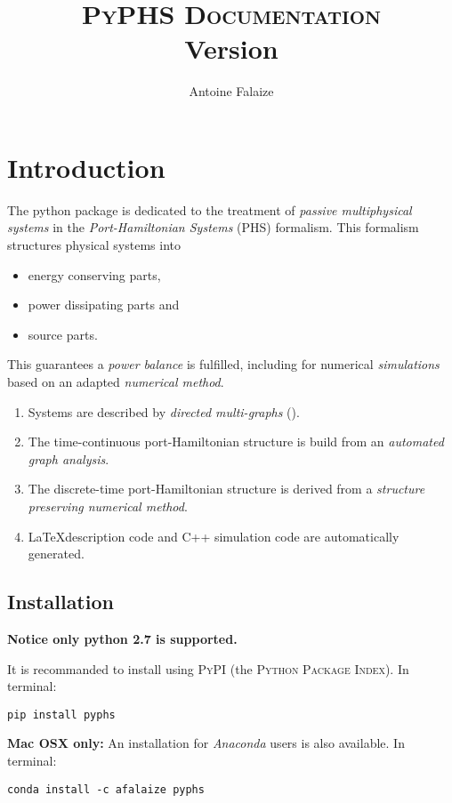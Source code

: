 \documentclass[10pt,a4paper]{article}
\author{Antoine Falaize}
\title{\textsc{PyPHS Documentation}\\ Version \version}
\begin{document}

%
\maketitle
%
\section{Introduction}
%
The python package  is dedicated to the treatment of \emph{passive multiphysical systems} in the \emph{Port-Hamiltonian Systems} (PHS) formalism. This formalism structures physical systems into 
%
\begin{itemize}
\item energy conserving parts, 
\item power dissipating parts and 
\item source parts.
\end{itemize}
%

This guarantees a \emph{power balance} is fulfilled, including for numerical \emph{simulations} based on an adapted \emph{numerical method}.   
%

\begin{enumerate}
\item Systems are described by \emph{directed multi-graphs} ().
\item The time-continuous port-Hamiltonian structure is build from an \emph{automated graph analysis}.
\item The discrete-time port-Hamiltonian structure is derived from a \emph{structure preserving numerical method}.
\item \LaTeX description code and \textsc{C++} simulation code are automatically generated.
\end{enumerate}
\subsection{Installation}
%
\begin{center}
\textbf{Notice only python 2.7 is supported.}
\end{center}
%
It is recommanded to install  using \textsc{PyPI} (the \textsc{Python Package Index}). In terminal:
%
\begin{verbatim}
pip install pyphs
\end{verbatim}
%
\textbf{Mac OSX only:} An installation for \emph{Anaconda} users is also available. In terminal:
%
\begin{verbatim}
conda install -c afalaize pyphs
\end{verbatim}
%
\end{document}
